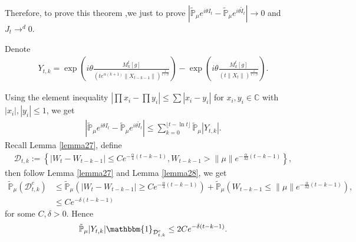\documentclass{article}
\begin{document}
    Therefore, to prove this theorem ,we just to prove $\left|\mathbb{\tilde{P}}_{\mu}e^{i\theta I_t}-\mathbb{\tilde{P}}_{\mu}e^{i\theta\tilde{I}_t}\right|\rightarrow 0$ and $J_t\rightarrow^d 0$.
    
    Denote
    \begin{align*}
        Y_{t,k}=\exp\left(i\theta\frac{M_k^t[g]}{(t e^{\alpha(k+1)}\|X_{t-k-1}\|)^{\frac{1}{1+\beta}}}\right)-\exp\left(i\theta\frac{M_k^t[g]}{\left(t\|X_t\|\right)^{\frac{1}{1+\beta}}}\right).
    \end{align*}
    
    Using the element inequality $|\prod x_i-\prod y_i|\leq\sum |x_i-y_i|$ for $x_i,y_i \in \mathbb{C}$ with $|x_i|,|y_i|\leq 1$, we get
    \begin{align*}
        \left|\mathbb{\tilde{P}}_{\mu}e^{i\theta I_t}-\mathbb{\tilde{P}}_{\mu}e^{i\theta\tilde{I}_t}\right|\leq \sum_{k=0}^{\lfloor t-\ln t \rfloor}\mathbb{\tilde{P}}_{\mu}|Y_{t,k}|.
    \end{align*}
    Recall Lemma \ref{lemma27}, define
    \begin{align*}
        \mathcal{D}_{t,k}:=\left\{|W_t-W_{t-k-1}|\leq C e^{-\frac{\alpha}{4}(t-k-1)}, W_{t-k-1}>\|\mu\|e^{-\frac{\alpha}{32}(t-k-1)}\right\},
    \end{align*}
    then follow Lemma \ref{lemma27} and Lemma \ref{lemma28}, we get
    \begin{align*}
        \mathbb{\tilde{P}}_{\mu}(\mathcal{D}_{t,k}^c)&\leq \mathbb{\tilde{P}}_{\mu}(|W_t-W_{t-k-1}|\geq C e^{-\frac{\alpha}{4}(t-k-1)})+\mathbb{\tilde{P}}_{\mu}(W_{t-k-1}\leq \|\mu\|e^{-\frac{\alpha}{32}(t-k-1)}),\\
        &\leq C e^{-\delta(t-k-1)}
    \end{align*}
    for some $C,\delta>0$. Hence
    \begin{align}
        \mathbb{\tilde{P}}_{\mu}|Y_{t,k}|\mathbbm{1}_{\mathcal{D}^c_{t,k}}\leq 2 C e^{-\delta(t-k-1)}.\label{thm121}
    \end{align}
    
\end{document}
